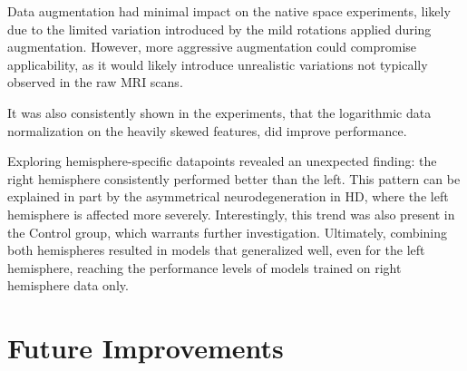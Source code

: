 Data augmentation had minimal impact on the native space experiments, likely due to the limited variation introduced by the mild rotations applied during augmentation. However, more aggressive augmentation could compromise applicability, as it would likely introduce unrealistic variations not typically observed in the raw \ac{MRI} scans.\par
It was also consistently shown in the experiments, that the logarithmic data normalization on the heavily skewed features, did improve performance.\par
Exploring hemisphere-specific datapoints revealed an unexpected finding: the right hemisphere consistently performed better than the left. This pattern can be explained in part by the asymmetrical neurodegeneration in \ac{HD}, where the left hemisphere is affected more severely. Interestingly, this trend was also present in the Control group, which warrants further investigation. Ultimately, combining both hemispheres resulted in models that generalized well, even for the left hemisphere, reaching the performance levels of models trained on right hemisphere data only.\par

\section{Future Improvements}
\label{sec:improve}

